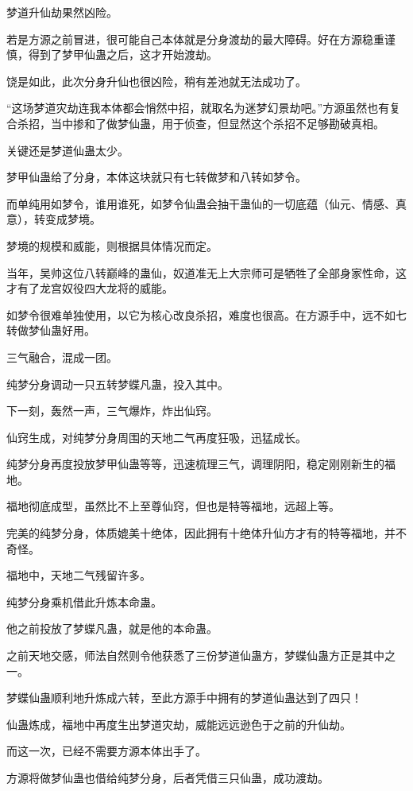 \begin{this_body}
梦道升仙劫果然凶险。

若是方源之前冒进，很可能自己本体就是分身渡劫的最大障碍。好在方源稳重谨慎，得到了梦甲仙蛊之后，这才开始渡劫。

饶是如此，此次分身升仙也很凶险，稍有差池就无法成功了。

“这场梦道灾劫连我本体都会悄然中招，就取名为迷梦幻景劫吧。”方源虽然也有复合杀招，当中掺和了做梦仙蛊，用于侦查，但显然这个杀招不足够勘破真相。

关键还是梦道仙蛊太少。

梦甲仙蛊给了分身，本体这块就只有七转做梦和八转如梦令。

而单纯用如梦令，谁用谁死，如梦令仙蛊会抽干蛊仙的一切底蕴（仙元、情感、真意），转变成梦境。

梦境的规模和威能，则根据具体情况而定。

当年，吴帅这位八转巅峰的蛊仙，奴道准无上大宗师可是牺牲了全部身家性命，这才有了龙宫奴役四大龙将的威能。

如梦令很难单独使用，以它为核心改良杀招，难度也很高。在方源手中，远不如七转做梦仙蛊好用。

三气融合，混成一团。

纯梦分身调动一只五转梦蝶凡蛊，投入其中。

下一刻，轰然一声，三气爆炸，炸出仙窍。

仙窍生成，对纯梦分身周围的天地二气再度狂吸，迅猛成长。

纯梦分身再度投放梦甲仙蛊等等，迅速梳理三气，调理阴阳，稳定刚刚新生的福地。

福地彻底成型，虽然比不上至尊仙窍，但也是特等福地，远超上等。

完美的纯梦分身，体质媲美十绝体，因此拥有十绝体升仙方才有的特等福地，并不奇怪。

福地中，天地二气残留许多。

纯梦分身乘机借此升炼本命蛊。

他之前投放了梦蝶凡蛊，就是他的本命蛊。

之前天地交感，师法自然则令他获悉了三份梦道仙蛊方，梦蝶仙蛊方正是其中之一。

梦蝶仙蛊顺利地升炼成六转，至此方源手中拥有的梦道仙蛊达到了四只！

仙蛊炼成，福地中再度生出梦道灾劫，威能远远逊色于之前的升仙劫。

而这一次，已经不需要方源本体出手了。

方源将做梦仙蛊也借给纯梦分身，后者凭借三只仙蛊，成功渡劫。


\end{this_body}
